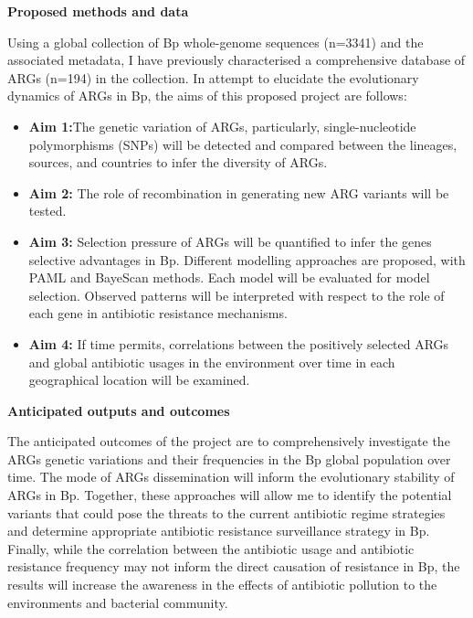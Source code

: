 \documentclass[11pt,twoside]{article}
\begin{document}
\vspace{1 mm}

\textbf{\Large Proposed methods and data}\\

\begin{spacing}{1.5}
	Using a global collection of Bp whole-genome sequences (n=3341) and the associated metadata, I have previously characterised a comprehensive database of ARGs (n=194) in the collection. In attempt to elucidate the evolutionary dynamics of ARGs in Bp, the aims of this proposed project are follows:

\begin{itemize}
	\item \textbf{Aim 1:}The genetic variation of ARGs, particularly, single-nucleotide polymorphisms (SNPs) will be detected and compared between the lineages, sources, and countries to infer the diversity of ARGs. 
	\item \textbf{Aim 2:} The role of recombination in generating new ARG variants will be tested. 
	\item \textbf{Aim 3:} Selection pressure of ARGs will be quantified to infer the genes selective advantages in Bp.  Different modelling approaches are proposed, with PAML \citep{yang_paml_2007} and BayeScan \citep{foll_genome-scan_2008} methods. Each model will be evaluated for model selection. Observed patterns will be interpreted with respect to the role of each gene in antibiotic resistance mechanisms.
	\item \textbf{Aim 4:} If time permits, correlations between the positively selected ARGs and global antibiotic usages \citep{browne_global_2021} in the environment over time in each geographical location will be examined.
\end{itemize}

\end{spacing}

\vspace{1 mm}

\textbf{\Large Anticipated outputs and outcomes}\\
\begin{spacing}{1.5}
	The anticipated outcomes of the project are to comprehensively investigate the ARGs genetic variations and their frequencies in the Bp global population over time. The mode of ARGs dissemination will inform the evolutionary stability of ARGs in Bp.  Together, these approaches will allow me to identify the potential variants that could pose the threats to the current antibiotic regime strategies and determine appropriate antibiotic resistance surveillance strategy in Bp. Finally, while the correlation between the antibiotic usage and antibiotic resistance frequency may not inform the direct causation of resistance in Bp, the results will increase the awareness in the effects of antibiotic pollution to the environments and bacterial community. 
\end{spacing}
\end{document}
